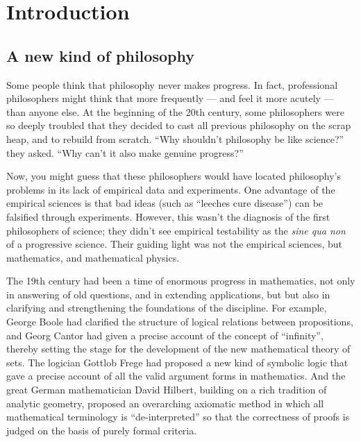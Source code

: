 \chapter*{Introduction}


\section*{A new kind of philosophy}

Some people think that philosophy never makes progress.  In fact,
professional philosophers might think that more frequently --- and
feel it more acutely --- than anyone else.  At the beginning of the
20th century, some philosophers were so deeply troubled that they
decided to cast all previous philosophy on the scrap heap, and to
rebuild from scratch.  ``Why shouldn't philosophy be like science?''
they asked.  ``Why can't it also make genuine progress?''

Now, you might guess that these philosophers would have located
philosophy's problems in its lack of empirical data and experiments.
One advantage of the empirical sciences is that bad ideas (such as
``leeches cure disease'') can be falsified through experiments.
However, this wasn't the diagnosis of the first philosophers of
science; they didn't see empirical testability as the {\it sine qua
  non} of a progressive science.  Their guiding light was not the
empirical sciences, but mathematics, and mathematical physics.

The 19th century had been a time of enormous progress in mathematics,
not only in answering of old questions, and in extending applications,
but but also in clarifying and strengthening the foundations of the
discipline.  For example, George Boole had clarified the structure of
logical relations between propositions, and Georg Cantor had given a
precise account of the concept of ``infinity'', thereby setting the
stage for the development of the new mathematical theory of sets.  The
logician Gottlob Frege had proposed a new kind of symbolic logic that
gave a precise account of all the valid argument forms in mathematics.
And the great German mathematician David Hilbert, building on a rich
tradition of analytic geometry, proposed an overarching axiomatic
method in which all mathematical terminology is ``de-interpreted'' so
that the correctness of proofs is judged on the basis of purely formal
criteria.

